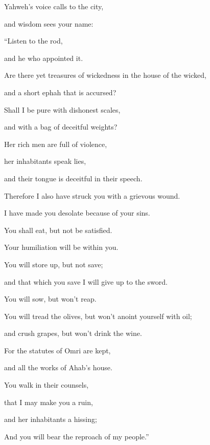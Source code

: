 {\par }{\BB \par }{\Q {}Yahweh’s voice calls to the city,
\par }{\QB and wisdom sees your name:
\par }{\Q “Listen to the rod,
\par }{\QB and he who appointed it.
\par }{\Q {}Are there yet treasures of wickedness in the house of the wicked,
\par }{\QB and a short ephah that is accursed?
\par }{\Q {}Shall I be pure with dishonest scales,
\par }{\QB and with a bag of deceitful weights?
\par }{\Q {}Her rich men are full of violence,
\par }{\QB her inhabitants speak lies,
\par }{\QB and their tongue is deceitful in their speech.
\par }{\Q {}Therefore I also have struck you with a grievous wound.
\par }{\QB I have made you desolate because of your sins.
\par }{\Q {}You shall eat, but not be satisfied.
\par }{\QB Your humiliation will be within you.
\par }{\QB You will store up, but not save;
\par }{\QB and that which you save I will give up to the sword.
\par }{\Q {}You will sow, but won’t reap.
\par }{\QB You will tread the olives, but won’t anoint yourself with oil;
\par }{\QB and crush grapes, but won’t drink the wine.
\par }{\Q {}For the statutes of Omri are kept,
\par }{\QB and all the works of Ahab’s house.
\par }{\QB You walk in their counsels,
\par }{\QB that I may make you a ruin,
\par }{\QB and her inhabitants a hissing;
\par }{\QB And you will bear the reproach of my people.”
\par }{\BB \par }
